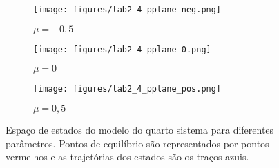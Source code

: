 \documentclass[a4paper]{report}
\begin{document}
\begin{figure}[H]
    \centering
    \begin{subfigure}{0.29\textwidth}
	\texttt{[image: figures/lab2\_4\_pplane\_neg.png]}
	\caption{$\mu=-0,5$}
    \end{subfigure}
    \begin{subfigure}{0.29\textwidth}
	\texttt{[image: figures/lab2\_4\_pplane\_0.png]}
	\caption{$\mu=0$}
    \end{subfigure}
    \begin{subfigure}{0.29\textwidth}
	\texttt{[image: figures/lab2\_4\_pplane\_pos.png]}
	\caption{$\mu=0,5$}
    \end{subfigure}
    \caption{Espaço de estados do modelo do quarto sistema para diferentes parâmetros. Pontos de equilíbrio são representados por pontos vermelhos e as trajetórias dos estados são os traços azuis.}
    \label{fig:pplane-4}
\end{figure}
\end{document}
